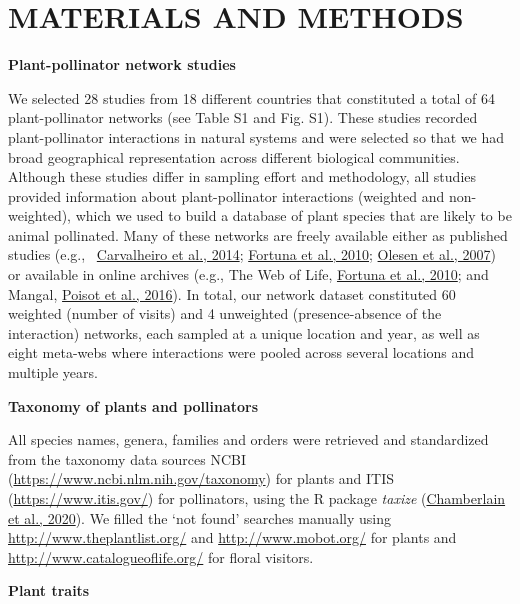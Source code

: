 \documentclass[
  12pt,
  a4paper,
]{article}
\begin{document}
\hypertarget{materials-and-methods}{%
\section{MATERIALS AND METHODS}\label{materials-and-methods}}

\textbf{Plant-pollinator network studies}

We selected 28 studies from 18 different countries that constituted a total of 64 plant-pollinator networks (see Table S1 and Fig. S1). These studies recorded plant-pollinator interactions in natural systems and were selected so that we had broad geographical representation across different biological communities. Although these studies differ in sampling effort and methodology, all studies provided information about plant-pollinator interactions (weighted and non-weighted), which we used to build a database of plant species that are likely to be animal pollinated. Many of these networks are freely available either as published studies (e.g.,~ \protect\hyperlink{ref-carvalheiro2014}{Carvalheiro et al., 2014}; \protect\hyperlink{ref-fortuna2010}{Fortuna et al., 2010}; \protect\hyperlink{ref-olesen2007}{Olesen et al., 2007}) or available in online archives (e.g., The Web of Life, \protect\hyperlink{ref-fortuna2010}{Fortuna et al., 2010}; and Mangal, \protect\hyperlink{ref-poisot2016}{Poisot et al., 2016}). In total, our network dataset constituted 60 weighted (number of visits) and 4 unweighted (presence-absence of the interaction) networks, each sampled at a unique location and year, as well as eight meta-webs where interactions were pooled across several locations and multiple years.

\textbf{Taxonomy of plants and pollinators}

All species names, genera, families and orders were retrieved and standardized from the taxonomy data sources NCBI (\url{https://www.ncbi.nlm.nih.gov/taxonomy}) for plants and ITIS (\url{https://www.itis.gov/}) for pollinators, using the R package \emph{taxize} (\protect\hyperlink{ref-chamberlain2020}{Chamberlain et al., 2020}). We filled the `not found' searches manually using \url{http://www.theplantlist.org/} and \url{http://www.mobot.org/} for plants and \url{http://www.catalogueoflife.org/} for floral visitors.

\textbf{Plant traits}
\end{document}
